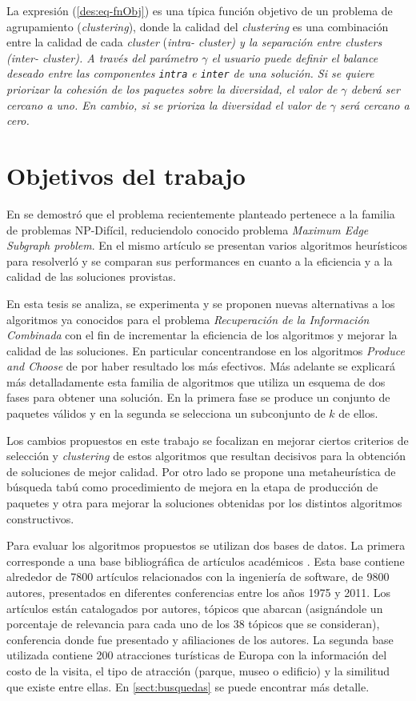 La expresión (\ref{des:eq-fnObj}) es una típica función objetivo de un problema de agrupamiento ({\em clustering}), donde la calidad del {\em clustering} es una combinación entre la calidad de cada {\em cluster} (\em{intra}- cluster) y la separación entre {\em clusters} (\em{inter}- cluster). A través del parámetro $\gamma$ el usuario puede definir el balance deseado entre las componentes \texttt{intra} e \texttt{inter} de una solución. Si se quiere priorizar la cohesión de los paquetes sobre la diversidad, el  valor de $\gamma$ deberá ser cercano a uno. En cambio, si se prioriza la diversidad el valor de $\gamma$ será cercano a cero.

\section{Objetivos del trabajo}
En \cite{compositeRetrival} se demostró que el problema recientemente planteado pertenece a la familia de problemas NP-Difícil, reduciendolo conocido problema {\em Maximum Edge Subgraph problem}. En el mismo artículo se presentan varios algoritmos heurísticos para resolverló y se comparan sus performances en cuanto a la eficiencia y a la calidad de las soluciones provistas.   

En esta tesis se analiza, se experimenta y se proponen nuevas alternativas a los algoritmos ya conocidos para el problema {\em Recuperación de la Información Combinada} con el fin de incrementar la eficiencia de los algoritmos y mejorar la calidad de las soluciones. En particular concentrandose en los algoritmos {\em Produce and Choose} de \cite{compositeRetrival} por haber resultado los más efectivos. Más adelante se explicará más detalladamente esta familia de algoritmos que utiliza un esquema de dos fases para obtener una solución. En la primera fase se produce un conjunto de paquetes válidos y en la segunda se selecciona un subconjunto de $k$ de ellos.

Los cambios propuestos en este trabajo se focalizan en mejorar ciertos criterios de selección y {\em clustering} de estos algoritmos que resultan decisivos para la obtención de soluciones de mejor calidad. Por otro lado se propone una metaheurística de búsqueda tabú como procedimiento de mejora en la etapa de producción de paquetes y otra para mejorar la soluciones obtenidas por los distintos algoritmos constructivos.

Para evaluar los algoritmos propuestos se utilizan dos bases de datos. La primera corresponde a una base bibliográfica de artículos académicos \cite{dataDrive}. Esta base contiene alrededor de 7800 artículos relacionados con la ingeniería de software, de 9800 autores, presentados en diferentes conferencias entre los años 1975 y 2011. Los artículos están catalogados por autores, tópicos que abarcan (asignándole un porcentaje de relevancia para cada uno de los 38 tópicos que se consideran), conferencia donde fue presentado y afiliaciones de los autores. La segunda base utilizada contiene 200 atracciones turísticas de Europa con la información del costo de la visita, el tipo de atracción (parque, museo o edificio) y la similitud que existe entre ellas. En \autoref{sect:busquedas} se puede encontrar más detalle.

